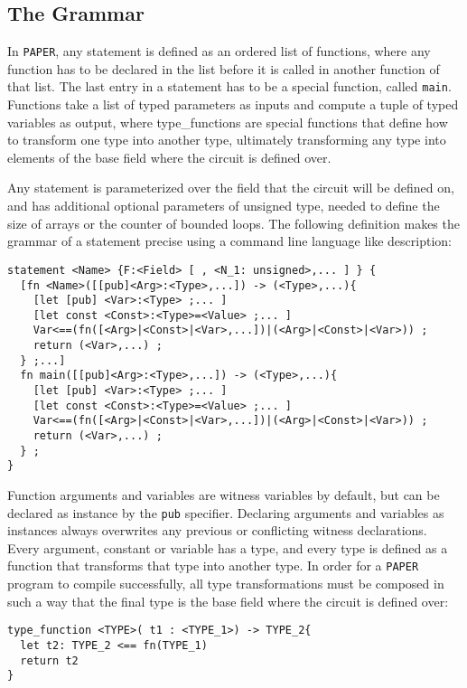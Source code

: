 \subsection{The Grammar}
In \texttt{PAPER}, any statement is defined as an ordered list of functions, where any function has to be declared in the list before it is called in another function of that list. The last entry in a statement has to be a special function, called \texttt{main}. Functions take a list of typed parameters as inputs and compute a tuple of typed variables as output, where type\_functions are special functions that define how to transform one type into another type, ultimately transforming any type into elements of the base field where the circuit is defined over. 

Any statement is parameterized over the field that the circuit will be defined on, and has additional optional parameters of unsigned type, needed to define the size of arrays or the counter of bounded loops. The following definition makes the grammar of a statement precise using a command line language like description: 
\begin{lstlisting}
statement <Name> {F:<Field> [ , <N_1: unsigned>,... ] } {
  [fn <Name>([[pub]<Arg>:<Type>,...]) -> (<Type>,...){
    [let [pub] <Var>:<Type> ;... ]
    [let const <Const>:<Type>=<Value> ;... ]
    Var<==(fn([<Arg>|<Const>|<Var>,...])|(<Arg>|<Const>|<Var>)) ;
    return (<Var>,...) ;
  } ;...]
  fn main([[pub]<Arg>:<Type>,...]) -> (<Type>,...){
    [let [pub] <Var>:<Type> ;... ]
    [let const <Const>:<Type>=<Value> ;... ]
    Var<==(fn([<Arg>|<Const>|<Var>,...])|(<Arg>|<Const>|<Var>)) ;
    return (<Var>,...) ;
  } ;
}
\end{lstlisting}
Function arguments and variables are witness variables by default, but can be declared as instance by the \texttt{pub} specifier. Declaring arguments and variables as instances always overwrites any previous or conflicting witness declarations. Every argument, constant or variable has a type, and every type is defined as a function that transforms that type into another type. In order for a \texttt{PAPER} program to compile successfully, all type transformations must be composed in such a way that the final type is the base field where the circuit is defined over: 
\begin{lstlisting}
type_function <TYPE>( t1 : <TYPE_1>) -> TYPE_2{
  let t2: TYPE_2 <== fn(TYPE_1)
  return t2
}
\end{lstlisting}
